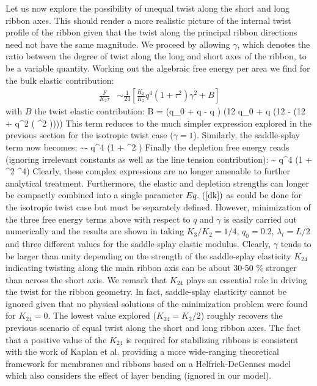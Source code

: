 Let us now explore the possibility of unequal twist along the short and long ribbon axes. This should render a more realistic picture of the internal twist profile of the ribbon  given that the twist along the principal ribbon directions need not have the same magnitude. We proceed by allowing $\gamma$, which denotes the ratio between the degree of twist along the long and short axes  of the ribbon,  to be a  variable quantity. Working out the algebraic free energy per area we find for the bulk elastic contribution:
\begin{align}
\frac{F}{ K_{2} \tau} &\sim 
\frac{1}{24} \left [ \frac{K_{3}}{K_{2}} q^{4} (1 + \tau^{2}) \gamma^{2} + B\right ]
\end{align}
with $B$ the twist elastic contribution:
\beq
B = (q_{0} + q - q \gamma) (12 q_{0} + q (12 - \gamma (12 + q^2 ( \tau^{2} ))))
\eeq
This term reduces to the much simpler expression explored in the previous section for the isotropic twist case ($\gamma =1$). Similarly, the saddle-splay term now becomes:
\beq
  \sim  -  q^{4} \gamma (1 + \tau^{2} \gamma)
\eeq
Finally the depletion free energy reads (ignoring irrelevant constants as well as the line tension contribution):
\beq
  \sim  {} q^{4} (1 + \tau^{2} \gamma^{4})
\eeq
Clearly, these complex expressions are no longer amenable to further analytical treatment. Furthermore, the elastic and depletion strengths can longer be compactly combined into a  single parameter $\eq{dk}$ as could be done for the isotropic twist case but must be  separately defined. However, minimization of the three free energy terms above with respect to $q$ and $\gamma$ is easily carried out numerically and the results are shown in  taking $K_{3}/K_{2} = 1/4$, $q_{0} = 0.2$, $\lambda_{t} = L/2$ and three different values for the saddle-splay elastic modulus. Clearly,  $\gamma $ tends to be larger than unity depending on the strength of the saddle-splay elasticity $K_{24}$ indicating twisting along the main ribbon axis can be about 30-50 \% stronger than across the short axis. We remark that $K_{24}$ plays an essential role in driving the  twist for the ribbon geometry. In fact, saddle-splay elasticity cannot be ignored given that  no physical solutions of the minimization problem were found  for $K_{24} =0$. The lowest value explored ($K_{24} = K_{2}/2$) roughly recovers the previous scenario of equal twist along the short and long ribbon axes. The fact that a positive value of the $K_{24}$ is required for stabilizing ribbons is consistent with the work of Kaplan {\rm et al.} \cite{kaplan2010theory} providing a more wide-ranging theoretical framework for membranes and ribbons  based on a Helfrich-DeGennes model which also considers the effect of layer bending (ignored in our model).  

